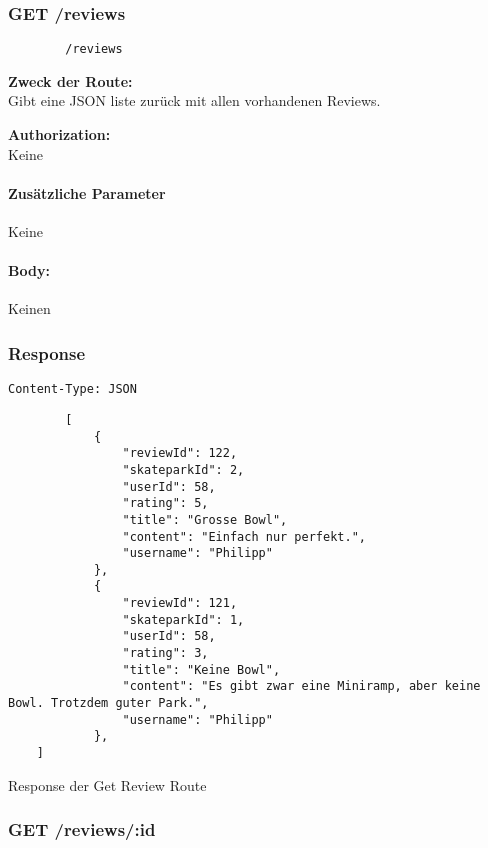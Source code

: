 \label{/reviews}

\subsubsection{GET /reviews}

\begin{lstlisting}
        /reviews
\end{lstlisting}

\textbf{Zweck der Route:} \\
Gibt  eine JSON liste zurück mit allen vorhandenen Reviews.

\textbf{Authorization:} \\
Keine

\paragraph{Zusätzliche Parameter}
Keine

\paragraph{Body:}

Keinen

\subsubsection{Response}

\begin{code}
    \lstinline{Content-Type: JSON}
    \begin{lstlisting}
        [
            {
                "reviewId": 122,
                "skateparkId": 2,
                "userId": 58,
                "rating": 5,
                "title": "Grosse Bowl",
                "content": "Einfach nur perfekt.",
                "username": "Philipp"
            },
            {
                "reviewId": 121,
                "skateparkId": 1,
                "userId": 58,
                "rating": 3,
                "title": "Keine Bowl",
                "content": "Es gibt zwar eine Miniramp, aber keine Bowl. Trotzdem guter Park.",
                "username": "Philipp"
            },
    ]
    \end{lstlisting}
    \caption{Response der Get Review Route }
\end{code}

\pagebreak

\subsubsection{GET /reviews/:id}

